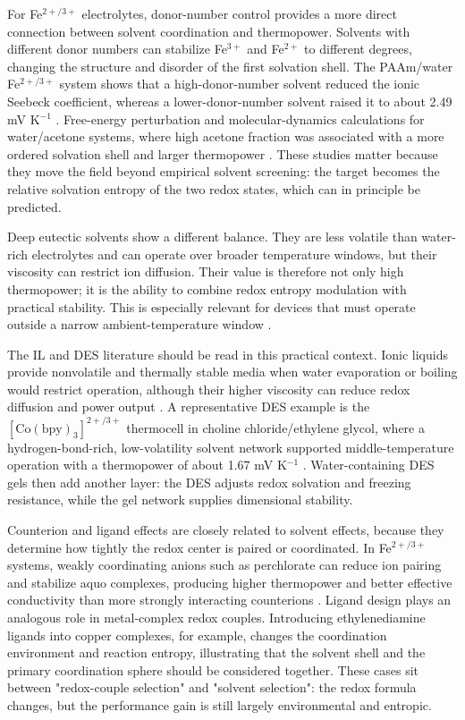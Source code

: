 \documentclass[a4paper,12pt]{report}
\begin{document}
For Fe$^{2+/3+}$ electrolytes, donor-number control provides a more direct
connection between solvent coordination and thermopower. Solvents with
different donor numbers can stabilize Fe$^{3+}$ and Fe$^{2+}$ to different
degrees, changing the structure and disorder of the first solvation shell. The
PAAm/water Fe$^{2+/3+}$ system shows that a
high-donor-number solvent reduced the ionic Seebeck coefficient, whereas a
lower-donor-number solvent raised it to about 2.49 mV K$^{-1}$
\citep{chen2023solvation}. Free-energy
perturbation and molecular-dynamics calculations for water/acetone systems,
where high acetone fraction was associated with a more ordered solvation shell
and larger thermopower \citep{chen2023solvation}. These studies matter because
they move the field beyond empirical solvent screening: the target becomes the
relative solvation entropy of the two redox states, which can in principle be
predicted.

Deep eutectic solvents show a different balance. They are less volatile than
water-rich electrolytes and can operate over broader temperature windows, but
their viscosity can restrict ion diffusion. Their value is therefore not only
high thermopower; it is the ability to combine redox entropy modulation with
practical stability. This is especially relevant for devices that must operate
outside a narrow ambient-temperature window \citep{antariksa2021deep}.

The IL and DES literature should be read in this practical context. Ionic
liquids provide nonvolatile and thermally stable media when water evaporation
or boiling would restrict operation, although their higher viscosity can reduce
redox diffusion and power output \citep{russo2019hydrogels}. A representative DES example is the
$[\mathrm{Co(bpy)}_3]^{2+/3+}$ thermocell in choline
chloride/ethylene glycol, where a hydrogen-bond-rich, low-volatility solvent
network supported middle-temperature operation with a thermopower of about
1.67 mV K$^{-1}$ \citep{antariksa2021deep}. Water-containing DES gels then add
another layer: the DES adjusts redox solvation and freezing resistance, while
the gel network supplies dimensional stability.

Counterion and ligand effects are closely related to solvent effects, because
they determine how tightly the redox center is paired or coordinated. In
Fe$^{2+/3+}$ systems, weakly coordinating anions such as perchlorate can reduce
ion pairing and stabilize aquo complexes, producing higher thermopower and
better effective conductivity than more strongly interacting counterions
\citep{duan2018aqueous}. Ligand design plays an analogous role in metal-complex
redox couples. Introducing ethylenediamine ligands into copper complexes, for
example, changes the coordination environment and reaction entropy, illustrating
that the solvent shell and the primary coordination sphere should be considered
together. These cases sit
between "redox-couple selection" and "solvent selection": the redox formula
changes, but the performance gain is still largely environmental and entropic.
\end{document}
